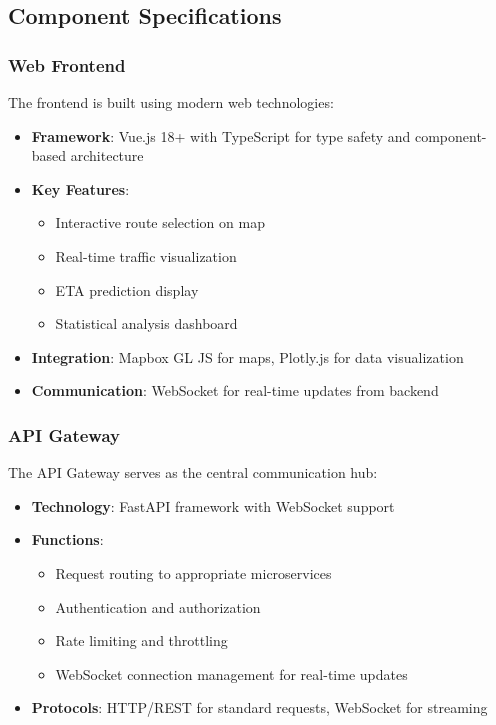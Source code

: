 \subsection{Component Specifications}

\subsubsection{Web Frontend}

The frontend is built using modern web technologies:
\begin{itemize}
    \item \textbf{Framework}: Vue.js 18+ with TypeScript for type safety and component-based architecture
    \item \textbf{Key Features}:
    \begin{itemize}
        \item Interactive route selection on map
        \item Real-time traffic visualization
        \item ETA prediction display
        \item Statistical analysis dashboard
    \end{itemize}
    \item \textbf{Integration}: Mapbox GL JS for maps, Plotly.js for data visualization
    \item \textbf{Communication}: WebSocket for real-time updates from backend
\end{itemize}

\subsubsection{API Gateway}

The API Gateway serves as the central communication hub:
\begin{itemize}
    \item \textbf{Technology}: FastAPI framework with WebSocket support
    \item \textbf{Functions}:
    \begin{itemize}
        \item Request routing to appropriate microservices
        \item Authentication and authorization
        \item Rate limiting and throttling
        \item WebSocket connection management for real-time updates
    \end{itemize}
    \item \textbf{Protocols}: HTTP/REST for standard requests, WebSocket for streaming
\end{itemize}

